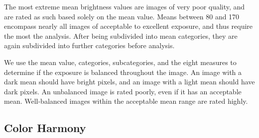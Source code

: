 \documentclass{article}
\begin{document}




The most extreme mean brightness values are images of very poor quality, and are rated as such based solely on the mean value. Means between 80 and 170 encompass nearly all images of acceptable to excellent exposure, and thus require the most the analysis. After being subdivided into mean categories, they are again subdivided into further categories before analysis.

We use the mean value, categories, subcategories, and the eight measures to determine if the exposure is balanced throughout the image. An image with a dark mean should have bright pixels, and an image with a light mean should have dark pixels. An unbalanced image is rated poorly, even if it has an acceptable mean. Well-balanced images within the acceptable mean range are rated highly.

\subsection{Color Harmony}   
\end{document}
